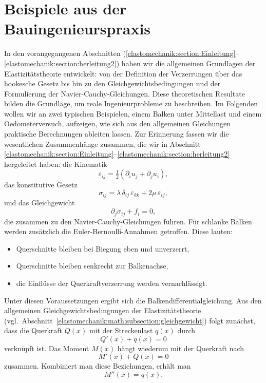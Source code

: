 %
%
%
%
\section{Beispiele aus der Bauingenieurspraxis}
\label{elastomechanik:section:teil4}
In den vorangegangenen Abschnitten
(\ref{elastomechanik:section:Einleitung}--\ref{elastomechanik:section:herleitung2})
haben wir die allgemeinen Grundlagen der Elastizitätstheorie entwickelt: 
von der Definition der Verzerrungen über das hookesche Gesetz bis
hin zu den Gleichgewichtsbedingungen und der Formulierung der
Navier-Cauchy-Gleichungen.
Diese theoretischen Resultate bilden die Grundlage, um reale
Ingenieurprobleme zu beschreiben. 
Im Folgenden wollen wir an zwei typischen Beispielen, einem Balken
unter Mittellast und einem Oedometerversuch, aufzeigen, wie sich
%
aus den allgemeinen Gleichungen praktische Berechnungen ableiten
lassen.
Zur Erinnerung fassen wir die wesentlichen Zusammenhänge zusammen,
die wir in Abschnitt
\ref{elastomechanik:section:Einleitung}--\ref{elastomechanik:section:herleitung2}
hergeleitet haben:
die Kinematik
\[
  \varepsilon_{ij} = \tfrac12(\partial_i u_j + \partial_j u_i),
\]
das konstitutive Gesetz
\[
  \sigma_{ij} = \lambda\, \delta_{ij}\,\varepsilon_{kk} + 2\mu\, \varepsilon_{ij},
\]
und das Gleichgewicht
\[
  \partial_j \sigma_{ij} + f_i = 0,
\]
die zusammen zu den Navier-Cauchy-Gleichungen führen.
Für schlanke Balken werden zusätzlich die Euler-Bernoulli-Annahmen getroffen. 
%
Diese lauten:
\begin{itemize}
  \item Querschnitte bleiben bei Biegung eben und unverzerrt,
  \item Querschnitte bleiben senkrecht zur Balkenachse,
  \item die Einflüsse der Querkraftverzerrung werden vernachlässigt.
\end{itemize}
Unter diesen Voraussetzungen ergibt sich die Balkendifferentialgleichung. 
Aus den allgemeinen Gleichgewichtsbedingungen der Elastizitätstheorie 
(vgl.~Abschnitt~\ref{elastomechanik:math:subsection:gleichgewicht})
folgt zunächst, dass die Querkraft \(Q(x)\) mit der 
Streckenlast \(q(x)\) durch
\[
  Q'(x) + q(x) = 0
\]
verknüpft ist.
Das Moment \(M(x)\) hängt wiederum mit der Querkraft nach
\[
  M'(x) + Q(x) = 0
\]
zusammen.
Kombiniert man diese Beziehungen, erhält man
\begin{equation*}
  M''(x) = q(x).
\label{elastomechanik:eqn:Mpp}
\end{equation*}

